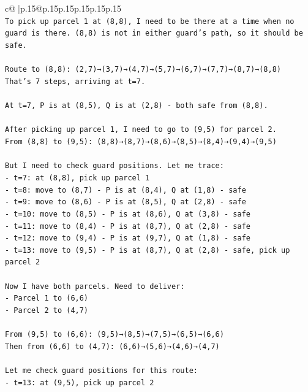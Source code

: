 \documentclass{article}
\begin{document}
{\begin{supertabular}{c@{$\;$}|p{.15\linewidth}@{}p{.15\linewidth}p{.15\linewidth}p{.15\linewidth}p{.15\linewidth}p{.15\linewidth}}
{{{\\ 
\texttt{To pick up parcel 1 at (8,8), I need to be there at a time when no guard is there. (8,8) is not in either guard's path, so it should be safe.} \\
\\ 
\texttt{Route to (8,8): (2,7)→(3,7)→(4,7)→(5,7)→(6,7)→(7,7)→(8,7)→(8,8)} \\
\texttt{That's 7 steps, arriving at t=7.} \\
\\ 
\texttt{At t=7, P is at (8,5), Q is at (2,8) {-} both safe from (8,8).} \\
\\ 
\texttt{After picking up parcel 1, I need to go to (9,5) for parcel 2.} \\
\texttt{From (8,8) to (9,5): (8,8)→(8,7)→(8,6)→(8,5)→(8,4)→(9,4)→(9,5)} \\
\\ 
\texttt{But I need to check guard positions. Let me trace:} \\
\texttt{{-} t=7: at (8,8), pick up parcel 1} \\
\texttt{{-} t=8: move to (8,7) {-} P is at (8,4), Q at (1,8) {-} safe} \\
\texttt{{-} t=9: move to (8,6) {-} P is at (8,5), Q at (2,8) {-} safe} \\
\texttt{{-} t=10: move to (8,5) {-} P is at (8,6), Q at (3,8) {-} safe} \\
\texttt{{-} t=11: move to (8,4) {-} P is at (8,7), Q at (2,8) {-} safe} \\
\texttt{{-} t=12: move to (9,4) {-} P is at (9,7), Q at (1,8) {-} safe} \\
\texttt{{-} t=13: move to (9,5) {-} P is at (8,7), Q at (2,8) {-} safe, pick up parcel 2} \\
\\ 
\texttt{Now I have both parcels. Need to deliver:} \\
\texttt{{-} Parcel 1 to (6,6)} \\
\texttt{{-} Parcel 2 to (4,7)} \\
\\ 
\texttt{From (9,5) to (6,6): (9,5)→(8,5)→(7,5)→(6,5)→(6,6)} \\
\texttt{Then from (6,6) to (4,7): (6,6)→(5,6)→(4,6)→(4,7)} \\
\\ 
\texttt{Let me check guard positions for this route:} \\
\texttt{{-} t=13: at (9,5), pick up parcel 2} \\
}}}
\end{supertabular}}
\end{document}
